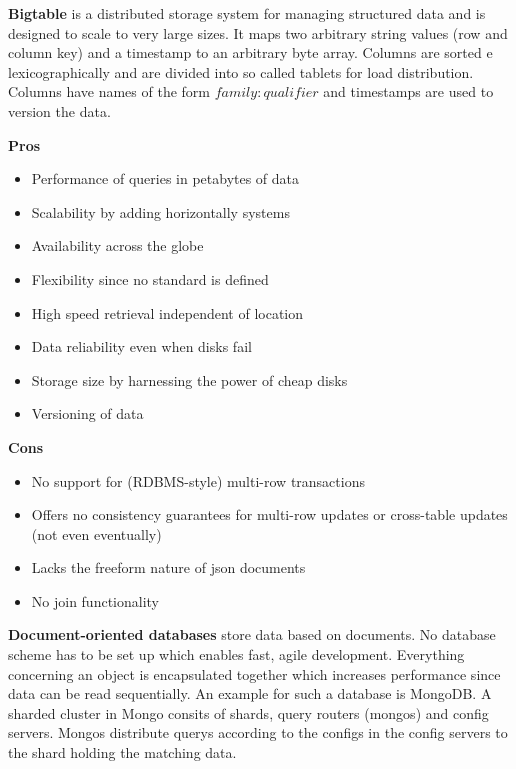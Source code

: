 \textbf{Bigtable} is a distributed storage system for managing structured data and is designed to scale to very large sizes.
It maps two arbitrary string values (row and column key) and a timestamp to an arbitrary byte array.
Columns are sorted e lexicographically and are divided into so called tablets for load distribution.
Columns have names of the form $family:qualifier$ and timestamps are used to version the data.\\
\begin{minipage}[t]{0.49\textwidth}
  \textbf{Pros}
  \begin{itemize}[topsep=0pt,noitemsep]
    \item Performance of queries in petabytes of data
    \item Scalability by adding horizontally systems
    \item Availability across the globe
    \item Flexibility since no standard is defined
    \item High speed retrieval independent of location
    \item Data reliability even when disks fail
    \item Storage size by harnessing the power of cheap disks
    \item Versioning of data
  \end{itemize}
\end{minipage}
\begin{minipage}[t]{0.49\textwidth}
  \textbf{Cons}
  \begin{itemize}[topsep=0pt, noitemsep]
    \item No support for (RDBMS-style) multi-row transactions
    \item Offers no consistency guarantees for multi-row updates or cross-table updates (not even eventually)
    \item Lacks the freeform nature of json documents
    \item No join functionality
  \end{itemize}
\end{minipage}
\vspace{20pt}

\textbf{Document-oriented databases} store data based on documents.
No database scheme has to be set up which enables fast, agile development.
Everything concerning an object is encapsulated together which increases performance since data can be read sequentially.
An example for such a database is MongoDB\@.
A sharded cluster in Mongo consits of shards, query routers (mongos) and config servers.
Mongos distribute querys according to the configs in the config servers to the shard holding the matching data.\\

